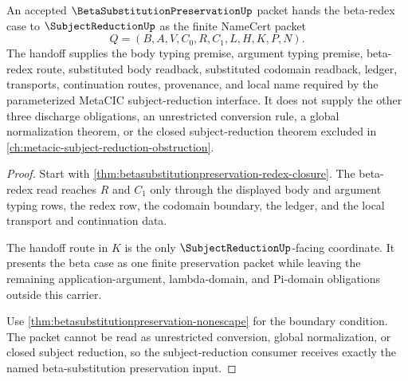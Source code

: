 \begin{theorem}
\label{thm:betasubstitutionpreservation-subjectreduction-handoff}
An accepted $\BetaSubstitutionPreservationUp$ packet hands the beta-redex case to $\SubjectReductionUp$ as the finite NameCert packet
$$
Q=(B,A,V,C_0,R,C_1,L,H,K,P,N).
$$
The handoff supplies the body typing premise, argument typing premise, beta-redex route, substituted body readback, substituted codomain readback, ledger, transports, continuation routes, provenance, and local name required by the parameterized MetaCIC subject-reduction interface. It does not supply the other three discharge obligations, an unrestricted conversion rule, a global normalization theorem, or the closed subject-reduction theorem excluded in \autoref{ch:metacic-subject-reduction-obstruction}.
\end{theorem}
\begin{proof}
Start with \autoref{thm:betasubstitutionpreservation-redex-closure}. The beta-redex read reaches $R$ and $C_1$ only through the displayed body and argument typing rows, the redex row, the codomain boundary, the ledger, and the local transport and continuation data.

The handoff route in $K$ is the only $\SubjectReductionUp$-facing coordinate. It presents the beta case as one finite preservation packet while leaving the remaining application-argument, lambda-domain, and Pi-domain obligations outside this carrier.

Use \autoref{thm:betasubstitutionpreservation-nonescape} for the boundary condition. The packet cannot be read as unrestricted conversion, global normalization, or closed subject reduction, so the subject-reduction consumer receives exactly the named beta-substitution preservation input.
\end{proof}

